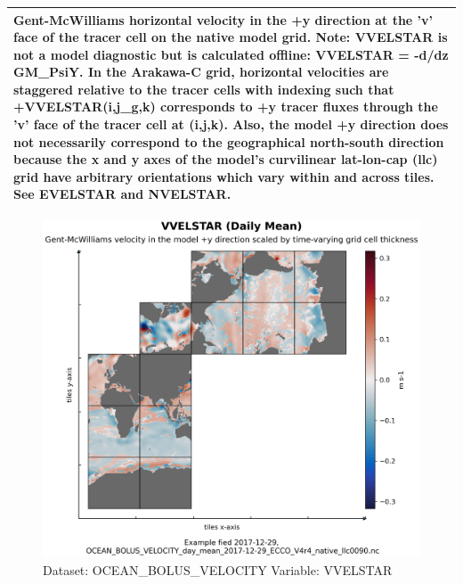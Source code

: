 \begin{longtable}{|p{}|p{}|p{}|p{}|}
\multicolumn{4}{|p{1\textwidth}|}{Gent-McWilliams horizontal velocity in the +y direction at the 'v' face of the tracer cell on the native model grid. Note: VVELSTAR is not a model diagnostic but is calculated offline: VVELSTAR = -d/dz GM\_PsiY. In the Arakawa-C grid, horizontal velocities are staggered relative to the tracer cells with indexing such that +VVELSTAR(i,j\_g,k) corresponds to +y tracer fluxes through the 'v' face of the tracer cell at (i,j,k). Also, the model +y direction does not necessarily correspond to the geographical north-south direction because the x and y axes of the model's curvilinear lat-lon-cap (llc) grid have arbitrary orientations which vary within and across tiles. See EVELSTAR and NVELSTAR.} \\ \hline
\end{longtable}

\begin{figure}[H]
\centering
\includegraphics[width=\textwidth]{../images/plots/native_plots/Gent-McWilliams_Ocean_Bolus_Velocity/VVELSTAR.png}
\caption{Dataset: OCEAN\_BOLUS\_VELOCITY Variable: VVELSTAR}
\label{tab:table-OCEAN_BOLUS_VELOCITY_VVELSTAR-Plot}
\end{figure}
\pagebreak
